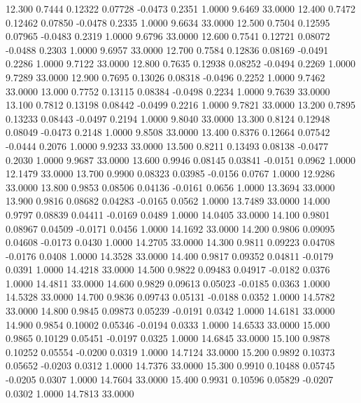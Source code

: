   12.300   0.7444   0.12322   0.07728  -0.0473   0.2351   1.0000   9.6469  33.0000
  12.400   0.7472   0.12462   0.07850  -0.0478   0.2335   1.0000   9.6634  33.0000
  12.500   0.7504   0.12595   0.07965  -0.0483   0.2319   1.0000   9.6796  33.0000
  12.600   0.7541   0.12721   0.08072  -0.0488   0.2303   1.0000   9.6957  33.0000
  12.700   0.7584   0.12836   0.08169  -0.0491   0.2286   1.0000   9.7122  33.0000
  12.800   0.7635   0.12938   0.08252  -0.0494   0.2269   1.0000   9.7289  33.0000
  12.900   0.7695   0.13026   0.08318  -0.0496   0.2252   1.0000   9.7462  33.0000
  13.000   0.7752   0.13115   0.08384  -0.0498   0.2234   1.0000   9.7639  33.0000
  13.100   0.7812   0.13198   0.08442  -0.0499   0.2216   1.0000   9.7821  33.0000
  13.200   0.7895   0.13233   0.08443  -0.0497   0.2194   1.0000   9.8040  33.0000
  13.300   0.8124   0.12948   0.08049  -0.0473   0.2148   1.0000   9.8508  33.0000
  13.400   0.8376   0.12664   0.07542  -0.0444   0.2076   1.0000   9.9233  33.0000
  13.500   0.8211   0.13493   0.08138  -0.0477   0.2030   1.0000   9.9687  33.0000
  13.600   0.9946   0.08145   0.03841  -0.0151   0.0962   1.0000  12.1479  33.0000
  13.700   0.9900   0.08323   0.03985  -0.0156   0.0767   1.0000  12.9286  33.0000
  13.800   0.9853   0.08506   0.04136  -0.0161   0.0656   1.0000  13.3694  33.0000
  13.900   0.9816   0.08682   0.04283  -0.0165   0.0562   1.0000  13.7489  33.0000
  14.000   0.9797   0.08839   0.04411  -0.0169   0.0489   1.0000  14.0405  33.0000
  14.100   0.9801   0.08967   0.04509  -0.0171   0.0456   1.0000  14.1692  33.0000
  14.200   0.9806   0.09095   0.04608  -0.0173   0.0430   1.0000  14.2705  33.0000
  14.300   0.9811   0.09223   0.04708  -0.0176   0.0408   1.0000  14.3528  33.0000
  14.400   0.9817   0.09352   0.04811  -0.0179   0.0391   1.0000  14.4218  33.0000
  14.500   0.9822   0.09483   0.04917  -0.0182   0.0376   1.0000  14.4811  33.0000
  14.600   0.9829   0.09613   0.05023  -0.0185   0.0363   1.0000  14.5328  33.0000
  14.700   0.9836   0.09743   0.05131  -0.0188   0.0352   1.0000  14.5782  33.0000
  14.800   0.9845   0.09873   0.05239  -0.0191   0.0342   1.0000  14.6181  33.0000
  14.900   0.9854   0.10002   0.05346  -0.0194   0.0333   1.0000  14.6533  33.0000
  15.000   0.9865   0.10129   0.05451  -0.0197   0.0325   1.0000  14.6845  33.0000
  15.100   0.9878   0.10252   0.05554  -0.0200   0.0319   1.0000  14.7124  33.0000
  15.200   0.9892   0.10373   0.05652  -0.0203   0.0312   1.0000  14.7376  33.0000
  15.300   0.9910   0.10488   0.05745  -0.0205   0.0307   1.0000  14.7604  33.0000
  15.400   0.9931   0.10596   0.05829  -0.0207   0.0302   1.0000  14.7813  33.0000
